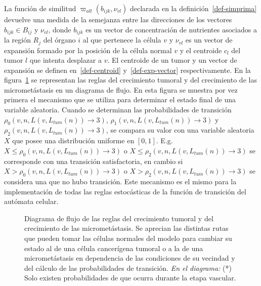 La funci\'on de similitud $\varpi_{alt}(b_{ijk},\nu_{vl})$ declarada en la definici\'on~\ref{def-simprima} devuelve una medida de la semejanza entre las direcciones de los vectores $b_{ijk} \in B_{ij}$ y $\nu_{vl}$, donde $b_{ijk}$ es un vector de concentraci\'on de nutrientes asociados a la regi\'on $R_j$ del \'organo $i$ al que pertenece la c\'elula $v$ y $\nu_{vl}$ es un vector de expansi\'on formado por la posici\'on de la c\'elula normal $v$ y el centroide $c_l$ del tumor $l$ que intenta desplazar a $v$. El centroide de un tumor y un vector de expansi\'on se definen en~\ref{def-centroid} y~\ref{def-exp-vector} respectivamente. En la figura~\ref{fig-flux-diagram} se representan las reglas del crecimiento tumoral y del crecimiento de las micromet\'astasis en un diagrama de flujo. En esta figura se muestra por vez primera el mecanismo que se utiliza para determinar el estado final de una variable aleatoria. Cuando se determinan las probabilidades de transici\'on $\rho_0(v,n,L(v,L_{tum}(n)) \rightarrow 3)$, $\rho_1(v,n,L(v,L_{tum}(n)) \rightarrow 3)$ y $\rho_2(v,n,L(v,L_{tum}(n)) \rightarrow 3)$, se compara su valor con una variable aleatoria $X$ que posee una distribuci\'on uniforme en $[0,1]$. E.g. $X \leq \rho_0(v,n,L(v,L_{tum}(n)) \rightarrow 3)$ o $X \leq \rho_2(v,n,L(v,L_{tum}(n)) \rightarrow 3)$ se corresponde con una transici\'on satisfactoria, en cambio si $X > \rho_0(v,n,L(v,L_{tum}(n)) \rightarrow 3)$ o $X > \rho_2(v,n,L(v,L_{tum}(n)) \rightarrow 3)$ se considera una que no hubo transici\'on. Este mecanismo es el mismo para la implementaci\'on de todas las reglas estoc\'asticas de la funci\'on de transici\'on del aut\'omata celular. 
\begin{figure}[h!]
\begin{center}
\end{center}
\caption[Diagrama de flujo de las reglas del crecimiento tumoral y del crecimiento de las micromet\'astasis]{Diagrama de flujo de las reglas del crecimiento tumoral y del crecimiento de las micromet\'astasis. Se aprecian las distintas rutas que pueden tomar las c\'elulas normales del modelo para cambiar su estado al de una c\'elula cancer\'igena tumoral o a la de una micromet\'astasis en dependencia de las condiciones de su vecindad y del c\'alculo de las probabilidades de transici\'on. \textit{En el diagrama:} (*) Solo existen probabilidades de que ocurra durante la etapa vascular.}
\label{fig-flux-diagram}
\end{figure}


